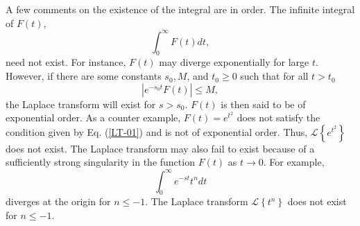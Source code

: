 A few comments on the existence of the integral are in order. The infinite integral of $F(t)$,
\begin{equation*}
\int_{0}^{\infty} F(t) d t,
\end{equation*}
need not exist. For instance, $F(t)$ may diverge exponentially for large $t$. However, if there are some constants $s_{0}, M$, and $t_{0} \geq 0$ such that for all $t>t_{0}$
\begin{equation}
\left|e^{-s_{0} t} F(t)\right| \leq M,\label{LT-01}
\end{equation}
the Laplace transform will exist for $s>s_{0} $. $F(t)$ is then said to be of exponential order. As a counter example, $F(t)=e^{t^{2}}$ does not satisfy the condition given by Eq. (\ref{LT-01}) and is not of exponential order. Thus, $\mathcal{L}\left\{e^{t^{2}}\right\}$ does not exist.
The Laplace transform may also fail to exist because of a sufficiently strong singularity in the function $F(t)$ as $t \rightarrow 0$. For example,
\begin{equation*}
\int_{0}^{\infty} e^{-s t} t^{n} d t
\end{equation*}
diverges at the origin for $n \leq-1$. The Laplace transform $\mathcal{L}\left\{t^{n}\right\}$ does not exist for $n \leq-1$. 

